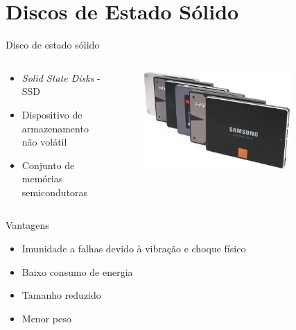 \documentclass[aspectratio=169,
				xcolor=table]{beamer}
\begin{document}
	\section{Discos de Estado Sólido}
	\begin{frame}{Disco de estado sólido}
		\begin{columns}
			\begin{column}{0.5\textwidth}
				\begin{itemize}
					\item \textit{Solid State Disks} - SSD
					\vspace{1em}
					\item Dispositivo de armazenamento não volátil
					\vspace{1em}
					\item Conjunto de memórias semicondutoras
				\end{itemize}
			\end{column}
			\begin{column}{0.5\textwidth}
				\begin{figure}[hbtp]
				\centering
				\includegraphics[width=0.8\textwidth, keepaspectratio]{../figs/cap08/ssd.jpg}
				\end{figure}			
			\end{column}
		\end{columns}

	\end{frame}
	
	\begin{frame}{Vantagens}
		\begin{itemize}
			\item Imunidade a falhas devido à vibração e choque físico
			\vspace{1em}
			\item Baixo consumo de energia
			\vspace{1em}
			\item Tamanho reduzido
			\vspace{1em}
			\item Menor peso
		\end{itemize}
	\end{frame}
	
\end{document}

